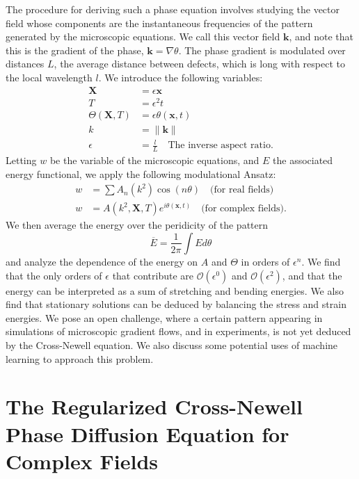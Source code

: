 \documentclass[12pt]{article}
\numberwithin{equation}{section}
\begin{document}
\par The procedure for deriving such a phase equation involves studying the vector field whose components are the instantaneous frequencies of the pattern generated by the microscopic equations. We call this vector field $\bm{k}$, and note that this is the gradient of the phase, $\bm{k} = \nabla \theta$. The phase gradient is modulated over distances $L$, the average distance between defects, which is long with respect to the local wavelength $l$. We introduce the following variables:
\begin{align*}
    \bm{X} &= \epsilon\bm{x}\\
    T &= \epsilon^2 t\\
    \Theta(\bm{X},T) &= \epsilon \theta(\bm{x},t)\\
    k &= \|\bm{k}\|\\
    \epsilon &= \frac{l}{L} \quad \text{The inverse aspect ratio}.
\end{align*}
Letting $w$ be the variable of the microscopic equations, and $E$ the associated energy functional, we apply the following modulational Ansatz:
\begin{align}
    w &= \sum A_n(k^2)\cos(n\theta) \quad \text{(for real fields)}\\
    w &= A(k^2,\bm{X},T)e^{i\theta(\bm{x},t)} \quad \text{(for complex fields)}.
\end{align}
We then average the energy over the peridicity of the pattern
\begin{equation}
    \overline{E} = \frac{1}{2\pi} \int E d\theta
\end{equation}
and analyze the dependence of the energy on $A$ and $\Theta$ in orders of $\epsilon^n$. We find that the only orders of $\epsilon$ that contribute are $\mathcal{O}(\epsilon^0)$ and $\mathcal{O}(\epsilon^2)$, and that the energy can be interpreted as a sum of stretching and bending energies. We also find that stationary solutions can be deduced by balancing the stress and strain energies. We pose an open challenge, where a certain pattern appearing in simulations of microscopic gradient flows, and in experiments, is not yet deduced by the Cross-Newell equation. We also discuss some potential uses of machine learning to approach this problem. 
\section{The Regularized Cross-Newell Phase Diffusion Equation for Complex Fields}
\end{document}
